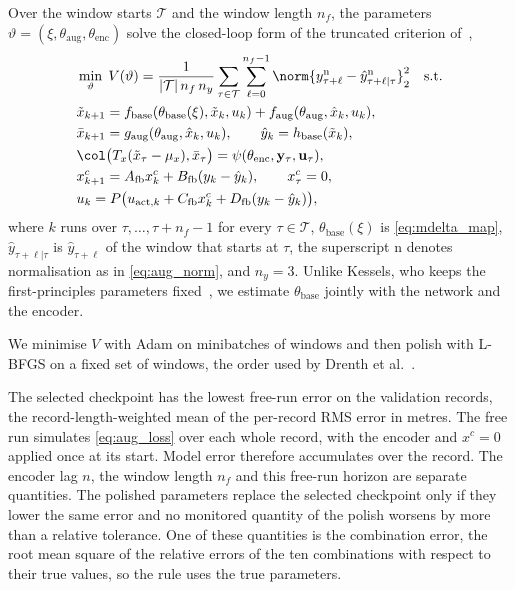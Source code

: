 Over the window starts $\mathcal T$ and the window length $n_f$, the parameters
$\vartheta=(\xi,\theta_{\mathrm{aug}},\theta_{\mathrm{enc}})$ solve the
closed-loop form of the truncated criterion
of~\cite[Eq.~(22)]{hoekstra2026lfr},
\begin{equation}
\begin{aligned}
 &\min_{\vartheta}\;V(\vartheta)=\frac{1}{|\mathcal T|\,n_f\,n_y}
 \sum_{\tau\in\mathcal T}\sum_{\ell=0}^{n_f-1}
 \norm{y^{\mathrm n}_{\tau+\ell}-\hat y^{\mathrm n}_{\tau+\ell|\tau}}_2^2
 \quad\text{s.t.}\\
 &\tilde x_{k+1}=f_{\mathrm{base}}(\theta_{\mathrm{base}}(\xi),\tilde x_k,u_k)
   +f_{\mathrm{aug}}(\theta_{\mathrm{aug}},\hat x_k,u_k),\\
 &\bar x_{k+1}=g_{\mathrm{aug}}(\theta_{\mathrm{aug}},\hat x_k,u_k),\qquad
   \hat y_k=h_{\mathrm{base}}(\tilde x_k),\\
 &\col\bigl(T_x(\tilde x_{\tau}-\mu_x),\bar x_{\tau}\bigr)
   =\psi(\theta_{\mathrm{enc}},\mathbf y_\tau,\mathbf u_\tau),\\
 &x^{c}_{k+1}=A_{\mathrm{fb}}x^{c}_k+B_{\mathrm{fb}}(y_k-\hat y_k),\qquad x^{c}_\tau=0,\\
 &u_k=P\bigl(u_{\mathrm{act},k}+C_{\mathrm{fb}}x^{c}_k+D_{\mathrm{fb}}(y_k-\hat y_k)\bigr),
\end{aligned}
\label{eq:aug_loss}
\end{equation}
where $k$ runs over $\tau,\dots,\tau+n_f-1$ for every $\tau\in\mathcal T$,
$\theta_{\mathrm{base}}(\xi)$ is \eqref{eq:mdelta_map},
$\hat y_{\tau+\ell|\tau}$ is $\hat y_{\tau+\ell}$ of the window that starts at
$\tau$, the superscript $\mathrm n$ denotes normalisation as in
\eqref{eq:aug_norm}, and $n_y=3$.
Unlike Kessels, who keeps the first-principles parameters
fixed~\cite[Eq.~(5.12)]{kessels2025ai}, we estimate $\theta_{\mathrm{base}}$
jointly with the network and the encoder.

We minimise $V$ with Adam on minibatches of windows and then polish with
L-BFGS on a fixed set of windows, the order used by Drenth et
al.~\cite[Sec.~5]{drenth2025lpvlfr}.

The selected checkpoint has the lowest free-run error on the validation
records, the record-length-weighted mean of the per-record RMS error in metres.
The free run simulates \eqref{eq:aug_loss} over each whole record, with the
encoder and $x^{c}=0$ applied once at its start.
Model error therefore accumulates over the record.
The encoder lag $n$, the window length $n_f$ and this free-run horizon are
separate quantities.
The polished parameters replace the selected checkpoint only if they lower the
same error and no monitored quantity of the polish worsens by more than a
relative tolerance.
One of these quantities is the combination error, the root mean square of the
relative errors of the ten combinations with respect to their true values, so
the rule uses the true parameters.

